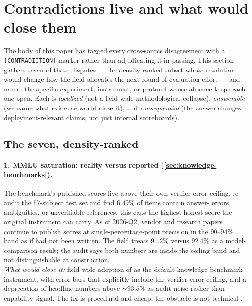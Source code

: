 
\section{Contradictions live and what would close them}
\label{sec:contradictions}
\label{sec:contradictions-live}

The body of this paper has tagged every cross-source disagreement
with a \texttt{[CONTRADICTION]} marker rather than adjudicating it
in passing. This section gathers seven of those disputes --- the
density-ranked subset whose resolution would change how the field
allocates the next round of evaluation effort --- and names the
specific experiment, instrument, or protocol whose absence keeps
each one open. Each is \emph{localized} (not a field-wide
methodological collapse), \emph{answerable} (we name what evidence
would close it), and \emph{consequential} (the answer changes
deployment-relevant claims, not just internal scoreboards).

\subsection{The seven, density-ranked}
\label{sec:contradictions-seven}

\paragraph{1. MMLU saturation: reality versus reported (\cref{sec:knowledge-benchmarks}).}
The benchmark's published scores live above their own
verifier-error ceiling. \citet{mmlu-redux-2024}%
re-audit the
$57$-subject test set and find $6.49\%$ of items contain
answer- errors, ambiguities, or unverifiable references; this
caps the highest honest score the original instrument can carry. As %
of 2026-Q2, vendor and research papers continue to publish 
scores at single-percentage-point precision in the
$90$--$94\%$ band as if  had not been written. The field
treats $91.2\%$ versus $92.4\%$ as a model-comparison result; the
audit says both numbers are inside the ceiling band and not
distinguishable at construction.\\
\emph{What would close it:} field-wide adoption of  as
the default knowledge-benchmark instrument, with error bars that
explicitly include the verifier-error ceiling, and a deprecation
of headline  numbers above $\sim\!93.5\%$ as
audit-noise rather than capability signal. The fix is procedural
and cheap; the obstacle is not technical
\citep{hendrycks2021-mmlu, mmlu-redux-2024, wang2024-mmlu-pro}.

